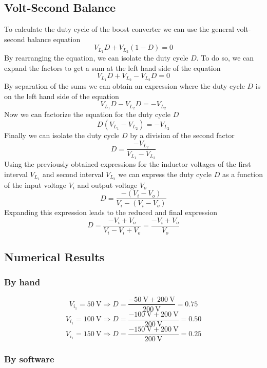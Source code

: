 %	

\subsection{Volt-Second Balance}
To calculate the duty cycle of the boost converter we can use the general
volt-second balance equation
\[ V_{L_{1}} D + V_{L_{2}} (1-D) = 0 \]
By rearranging the equation, we can isolate the duty cycle $D$. To do so,
we can expand the factors to get a sum at the left hand side of the equation
\[ V_{L_{1}} D + V_{L_{2}} - V_{L_{2}} D = 0 \]
By separation of the sums we can obtain an expression where the duty cycle $D$
is on the left hand side of the equation
\[ V_{L_{1}} D - V_{L_{2}} D = - V_{L_{2}} \]
Now we can factorize the equation for the duty cycle $D$
\[ D (V_{L_{1}} - V_{L_{2}}) = -V_{L_{2}} \]
Finally we can isolate the duty cycle $D$ by a division of the second factor
\[ D = \frac{- V_{L_{2}}}{V_{L_{1}} - V_{L_{2}}} \]
Using the previously obtained expressions for the inductor voltages of the
first interval $V_{L_{1}}$ and second interval $V_{L_{2}}$ we can express
the duty cycle $D$ as a function of the input voltage $V_i$ and output voltage
$V_o$
\[  D = \frac{-(V_i - V_o)}{V_i - (V_i - V_o)} \]
Expanding this expression leads to the reduced and final expression
\[ D = \frac{- V_i + V_o}{V_i - V_i + V_o} = \frac{- V_i + V_o}{V_o} \]

\subsection{Numerical Results}

\subsubsection{By hand}
\[ V_{i_{1}} = \SI{50}{\volt}  \Rightarrow D = \frac{- \SI{50}{\volt}  + \SI{200}{\volt}}{\SI{200}{\volt}}  = 0.75 \]
\[ V_{i_{1}} = \SI{100}{\volt} \Rightarrow D = \frac{- \SI{100}{\volt} + \SI{200}{\volt}}{\SI{200}{\volt}} = 0.50 \]
\[ V_{i_{1}} = \SI{150}{\volt} \Rightarrow D = \frac{- \SI{150}{\volt} + \SI{200}{\volt}}{\SI{200}{\volt}} = 0.25 \]

\subsubsection{By software}



%
\clearpage
